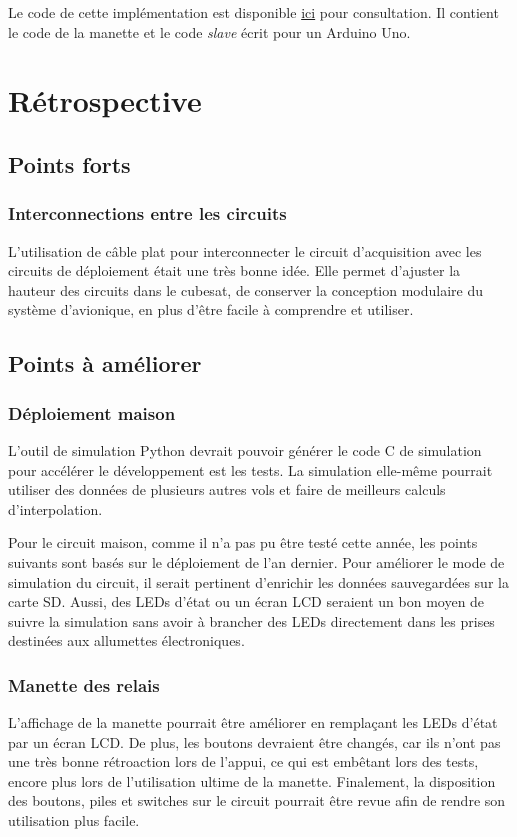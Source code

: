 Le code de cette implémentation est disponible
\href{https://github.com/ul-gaul/manette}{ici} pour consultation. Il contient
le code de la manette et le code \textit{slave} écrit pour un Arduino Uno.

\section{Rétrospective}

\subsection{Points forts}

\subsubsection{Interconnections entre les circuits}
L'utilisation de câble plat pour interconnecter le circuit d'acquisition avec
les circuits de déploiement était une très bonne idée. Elle permet d'ajuster la
hauteur des circuits dans le cubesat, de conserver la conception modulaire du
système d'avionique, en plus d'être facile à comprendre et utiliser.

\subsection{Points à améliorer}

\subsubsection{Déploiement maison}

L'outil de simulation Python devrait pouvoir générer le code C de simulation
pour accélérer le développement est les tests. La simulation elle-même pourrait
utiliser des données de plusieurs autres vols et faire de meilleurs calculs
d'interpolation.
\\
\par
Pour le circuit maison, comme il n'a pas pu être testé cette année, les points
suivants sont basés sur le déploiement de l'an dernier. Pour améliorer le mode
de simulation du circuit, il serait pertinent d'enrichir les données
sauvegardées sur la carte SD. Aussi, des LEDs d'état ou un écran LCD seraient
un bon moyen de suivre la simulation sans avoir à brancher des LEDs directement
dans les prises destinées aux allumettes électroniques.

\subsubsection{Manette des relais}

L'affichage de la manette pourrait être améliorer en remplaçant les LEDs d'état
par un écran LCD. De plus, les boutons devraient être changés, car ils n'ont
pas une très bonne rétroaction lors de l'appui, ce qui est embêtant lors des
tests, encore plus lors de l'utilisation ultime de la manette. Finalement, la
disposition des boutons, piles et switches sur le circuit pourrait être revue
afin de rendre son utilisation plus facile.
